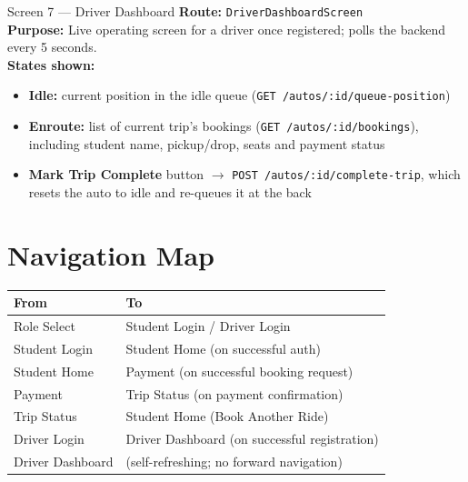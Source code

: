 \documentclass[11pt,a4paper]{article}
\begin{document}
\begin{screenbox}{Screen 7 --- Driver Dashboard}
\textbf{Route:} \texttt{DriverDashboardScreen} \\[4pt]
\textbf{Purpose:} Live operating screen for a driver once registered; polls the
backend every 5 seconds. \\[4pt]
\textbf{States shown:}
\begin{itemize}[leftmargin=*, itemsep=1pt]
  \item \textbf{Idle:} current position in the idle queue
        (\texttt{GET /autos/:id/queue-position})
  \item \textbf{Enroute:} list of current trip's bookings
        (\texttt{GET /autos/:id/bookings}), including student name, pickup/drop,
        seats and payment status
  \item \textbf{Mark Trip Complete} button $\rightarrow$
        \texttt{POST /autos/:id/complete-trip}, which resets the auto to idle and
        re-queues it at the back
\end{itemize}
\end{screenbox}

\section{Navigation Map}
\begin{center}
\begin{tabular}{ll}
\toprule
\textbf{From} & \textbf{To} \\
\midrule
Role Select & Student Login / Driver Login \\
Student Login & Student Home (on successful auth) \\
Student Home & Payment (on successful booking request) \\
Payment & Trip Status (on payment confirmation) \\
Trip Status & Student Home (Book Another Ride) \\
Driver Login & Driver Dashboard (on successful registration) \\
Driver Dashboard & (self-refreshing; no forward navigation) \\
\bottomrule
\end{tabular}
\end{center}
\end{document}
